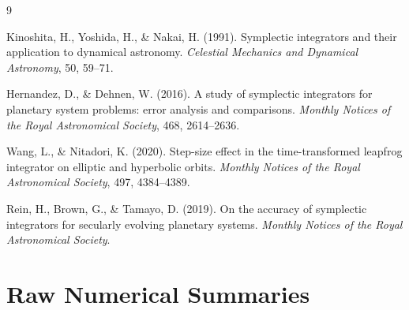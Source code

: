 \documentclass[twocolumn, 10pt]{article}
\begin{document}
\begin{thebibliography}{9}

Kinoshita, H., Yoshida, H., \& Nakai, H. (1991).
Symplectic integrators and their application to dynamical astronomy.
\textit{Celestial Mechanics and Dynamical Astronomy}, 50, 59--71.

Hernandez, D., \& Dehnen, W. (2016).
A study of symplectic integrators for planetary system problems: error analysis and comparisons.
\textit{Monthly Notices of the Royal Astronomical Society}, 468, 2614--2636.

Wang, L., \& Nitadori, K. (2020).
Step-size effect in the time-transformed leapfrog integrator on elliptic and hyperbolic orbits.
\textit{Monthly Notices of the Royal Astronomical Society}, 497, 4384--4389.

Rein, H., Brown, G., \& Tamayo, D. (2019).
On the accuracy of symplectic integrators for secularly evolving planetary systems.
\textit{Monthly Notices of the Royal Astronomical Society}.

\end{thebibliography}

\appendix
\section{Raw Numerical Summaries}
\label{sec:appendix}
\end{document}
